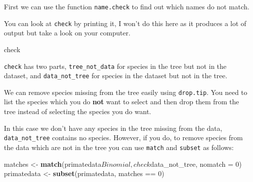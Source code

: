 \documentclass[]{book}
\newenvironment{Shaded}{\begin{snugshade}}{\end{snugshade}}
\newcommand{\KeywordTok}[1]{\textcolor[rgb]{0.13,0.29,0.53}{\textbf{{#1}}}}
\newcommand{\DataTypeTok}[1]{\textcolor[rgb]{0.13,0.29,0.53}{{#1}}}
\newcommand{\DecValTok}[1]{\textcolor[rgb]{0.00,0.00,0.81}{{#1}}}
\newcommand{\StringTok}[1]{\textcolor[rgb]{0.31,0.60,0.02}{{#1}}}
\newcommand{\NormalTok}[1]{{#1}}
\theoremstyle{definition}
\theoremstyle{definition}
\theoremstyle{definition}
\theoremstyle{remark}
\begin{document}
First we can use the function \texttt{name.check} to find out which
names do not match.

\begin{Shaded}
\end{Shaded}

You can look at \texttt{check} by printing it, I won't do this here as
it produces a lot of output but take a look on your computer.

\begin{Shaded}
\begin{Highlighting}[]
\NormalTok{check}
\end{Highlighting}
\end{Shaded}

\texttt{check} has two parts, \texttt{tree\_not\_data} for species in
the tree but not in the dataset, and \texttt{data\_not\_tree} for
species in the dataset but not in the tree.

We can remove species missing from the tree easily using
\texttt{drop.tip}. You need to list the species which you do
\textbf{not} want to select and then drop them from the tree instead of
selecting the species you do want.

\begin{Shaded}
\end{Shaded}

In this case we don't have any species in the tree missing from the
data, \texttt{data\_not\_tree} contains no species. However, if you do,
to remove species from the data which are not in the tree you can use
\texttt{match} and \texttt{subset} as follows:

\begin{Shaded}
\begin{Highlighting}[]
\NormalTok{matches <-}\StringTok{ }\KeywordTok{match}\NormalTok{(primatedata$Binomial, check$data_not_tree, }\DataTypeTok{nomatch =} \DecValTok{0}\NormalTok{)}
\NormalTok{primatedata <-}\StringTok{ }\KeywordTok{subset}\NormalTok{(primatedata, matches ==}\StringTok{ }\DecValTok{0}\NormalTok{)}
\end{Highlighting}
\end{Shaded}
\end{document}
